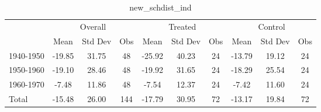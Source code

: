 \begin{table}[htbp]\centering
\def\sym#1{\ifmmode^{#1}\else\(^{#1}\)\fi}
\caption{new\_schdist\_ind \label{tab1}}
\begin{tabular}{l*{3}{ccc}}
\toprule
                    &\multicolumn{3}{c}{Overall}           &\multicolumn{3}{c}{Treated}           &\multicolumn{3}{c}{Control}           \\
                    &        Mean&     Std Dev&         Obs&        Mean&     Std Dev&         Obs&        Mean&     Std Dev&         Obs\\
\midrule
1940-1950           &      -19.85&       31.75&          48&      -25.92&       40.23&          24&      -13.79&       19.12&          24\\
1950-1960           &      -19.10&       28.46&          48&      -19.92&       31.65&          24&      -18.29&       25.54&          24\\
1960-1970           &       -7.48&       11.86&          48&       -7.54&       12.37&          24&       -7.42&       11.60&          24\\
Total               &      -15.48&       26.00&         144&      -17.79&       30.95&          72&      -13.17&       19.84&          72\\
\bottomrule
\end{tabular}
\end{table}
